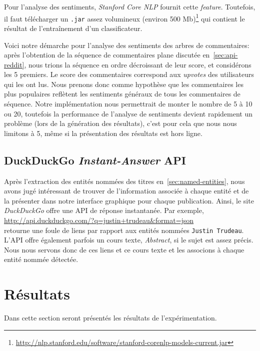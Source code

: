 \documentclass[12pt]{article}
\begin{document}
Pour l'analyse des sentiments, \textit{Stanford Core NLP} fournit cette \textit{feature}. Toutefois, il faut télécharger un \verb;.jar; assez volumineux (environ 500 Mb)\footnote{\url{http://nlp.stanford.edu/software/stanford-corenlp-models-current.jar}} qui contient le résultat de l'entraînement d'un classificateur.


Voici notre démarche pour l'analyse des sentiments des arbres de commentaires: après l'obtention de la séquence de commentaires plane discutée en~\ref{sec:api-reddit}, nous trions la séquence en ordre décroissant de leur score, et considérons les 5 premiers. Le score des commentaires correspond aux \textit{upvotes} des utilisateurs qui les ont lus. Nous prenons donc comme hypothèse que les commentaires les plus populaires reflètent les sentiments généraux de tous les commentaires de séquence. Notre implémentation nous permettrait de monter le nombre de 5 à 10 ou 20, toutefois la performance de l'analyse de sentiments devient rapidement un problème (lors de la génération des résultats), c'est pour cela que nous nous limitons à 5, même si la présentation des résultats est hors ligne.

\subsection{DuckDuckGo \textit{Instant-Answer} API}

Après l'extraction des entités nommées des titres en~\ref{sec:named-entities}, nous avons jugé intéressant de trouver de l'information associée à chaque entité et de la présenter dans notre interface graphique pour chaque publication. Ainsi, le site \textit{DuckDuckGo} offre une API de réponse instantanée. Par exemple,\\

\url{http://api.duckduckgo.com/?q=justin+trudeau&format=json}\\

retourne une foule de liens par rapport aux entités nommées \verb;Justin Trudeau;. L'API offre également parfois un cours texte, \textit{Abstract}, si le sujet est assez précis. Nous nous servons donc de ces liens et ce cours texte et les associons à chaque entité nommée détectée.

\section{Résultats}

Dans cette section seront présentés les résultats de l'expérimentation.
\end{document}
